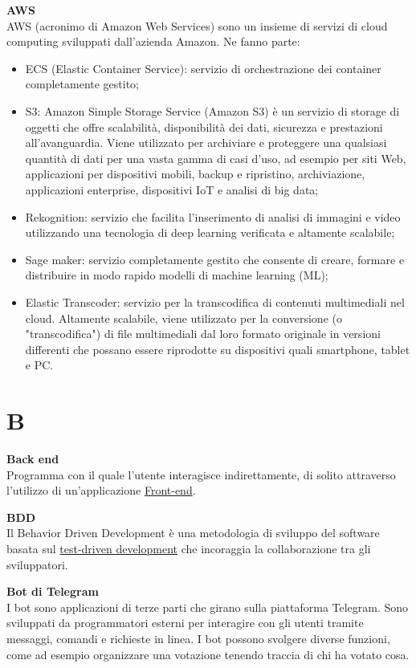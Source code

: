 \documentclass[a4paper, oneside, openany, dvipsnames, table, 12pt]{article}
\begin{document}
\textbf{AWS} \\
AWS (acronimo di Amazon Web Services) sono un insieme di servizi di cloud computing sviluppati dall'azienda Amazon. Ne fanno parte: 
\begin{itemize}
\item ECS (Elastic Container Service): servizio di orchestrazione dei container completamente gestito;
\item S3: Amazon Simple Storage Service (Amazon S3) è un servizio di storage di oggetti che offre scalabilità, disponibilità dei dati, sicurezza e prestazioni all'avanguardia. Viene utilizzato per archiviare e proteggere una qualsiasi quantità di dati per una vasta gamma di casi d'uso, ad esempio per siti Web, applicazioni per dispositivi mobili, backup e ripristino, archiviazione, applicazioni enterprise, dispositivi IoT e analisi di big data;
\item Rekognition: servizio che facilita l'inserimento di analisi di immagini e video utilizzando una tecnologia di deep learning verificata e altamente scalabile;
\item Sage maker: servizio completamente gestito che consente di creare, formare e distribuire in modo rapido modelli di machine learning (ML);
\item Elastic Transcoder: servizio per la transcodifica di contenuti multimediali nel cloud. Altamente scalabile, viene utilizzato per la conversione (o "transcodifica") di file multimediali dal loro formato originale in versioni differenti che possano essere riprodotte su dispositivi quali smartphone, tablet e PC.
\end{itemize}

\newpage
\section{B}
\textbf{Back end} \\
Programma con il quale l’utente interagisce indirettamente, di solito attraverso l’utilizzo di un’applicazione \hyperref[par:frontend]{Front-end}.

\textbf{BDD} \\
Il Behavior Driven Development è una metodologia di sviluppo del software basata sul \hyperref[par:tdd]{test-driven development} che incoraggia la collaborazione tra gli sviluppatori.

\textbf{Bot di Telegram} \\
I bot sono applicazioni di terze parti che girano sulla piattaforma Telegram. Sono sviluppati da programmatori esterni per interagire con gli utenti tramite messaggi, comandi e richieste in linea. I bot possono svolgere diverse funzioni, come ad esempio organizzare una votazione tenendo traccia di chi ha votato cosa.
\end{document}
